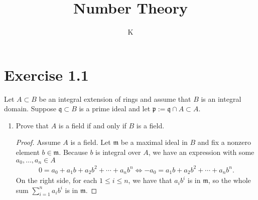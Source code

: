 \documentclass[a4paper]{article}
\title{Number Theory}
\author{K}
\begin{document}
\section*{Exercise 1.1}
Let \(A \subset B\) be an integral extension of rings and assume that \(B\) is an integral domain. Suppose \(\mathfrak{q} \subset B\) is a prime ideal and let \(\mathfrak{p} := 
\mathfrak{q} \cap A \subset A\).
\begin{enumerate}
  \item Prove that \(A\) is a field if and only if \(B\) is a field.
  \begin{proof}
    Assume \(A\) is a field. Let \(\mathfrak{m}\) be a maximal ideal in \(B\) and fix a nonzero element \(b \in \mathfrak{m}\). Because \(b\) is integral over \(A\), we have an expression with some \(a_0, \ldots, a_n \in A\)
    \begin{align*}
      0 = a_0 + a_1 b + a_2 b^2 + \cdots + a_n b^n \iff -a_0 = a_1 b + a_2 b^2 + \cdots + a_n b^n \text{.}
    \end{align*}
    On the right side, for each \(1 \leq i \leq n\), we have that \(a_i b^i\) is in \(\mathfrak{m}\), so the whole sum \(\sum_{i=1}^n a_i b^i\) is in \(\mathfrak{m}\).
    

\end{proof}
\end{enumerate}
\end{document}
